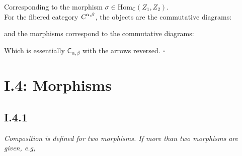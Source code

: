 \documentclass[11pt,a4paper]{article}
\newcommand{\morph}[3]{\text{Hom}_{#1}(#2,#3)}
\begin{document}
\begin{center}
\end{center}

\noindent Corresponding to the morphism $\sigma \in \morph{\textsf{C}}{Z_1}{Z_2}$. \\

\noindent For the fibered category $\textsl{C}^{\alpha, \beta}$, the objects are the commutative diagrams:

\begin{center}
\end{center}

\noindent and the morphisms correspond to the commutative diagrams:

\begin{center}
\end{center}

\noindent Which is essentially $\textsf{C}_{\alpha,\beta}$ with the arrows reversed. $\square$

\newpage

\section*{I.4: Morphisms}
\subsection*{I.4.1} \textit{Composition is defined for two morphisms.  If more than two morphisms are given, e.g,}

\begin{center}
\end{center}
\end{document}
